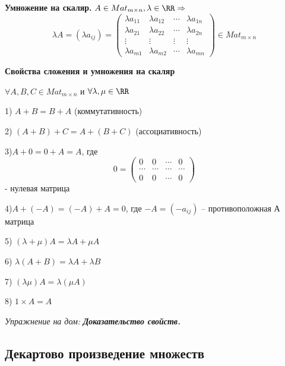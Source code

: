 \textbf{Умножение на скаляр.} $A \in Mat_{m\times n}, \lambda \in \RR \Rightarrow$
\begin{equation*} \lambda A = (\lambda a_{ij}) = 
\begin{pmatrix}
		\lambda a_{11} & \lambda a_{12} & \cdots & \lambda a_{1n} \\
		\lambda a_{21} & \lambda a_{22} & \cdots & \lambda a_{2n} \\
       \vdots & \vdots & \vdots& \vdots \\ 
       \lambda a_{m1} & \lambda a_{m2} & \cdots & \lambda a_{mn}
\end{pmatrix} \in Mat_{m\times n}
\end{equation*}

\bigskip
\textbf{Свойства сложения и умножения на скаляр}

$\forall A, B, C \in Mat_{m\times n}$ и $\forall \lambda, \mu \in \RR$

1) $A + B = B + A$ (коммутативность)

2) $(A + B) + C = A + (B + C)$ (ассоциативность)

3)$A + 0 = 0 + A = A$, где \begin{equation*}0 = \begin{pmatrix}
0 & 0 & \cdots & 0 \\
\cdots & \cdots & \cdots & \cdots \\
0 & 0 & \cdots & 0
\end{pmatrix} \end{equation*} - нулевая матрица

4)$A + (-A) = (-A) + A = 0$, где $-A = (-a_{ij})$ -- противоположная А матрица 

5) $(\lambda + \mu)A = \lambda A + \mu A$

6) $\lambda (A + B) = \lambda A + \lambda B$

7) $(\lambda \mu) A = \lambda (\mu A)$

8) $1 \times A = A$

\bigskip
\textit{Упражнение на дом:} \textbf{\textit{Доказательство свойств.}}

\bigskip
\begin{comment}
	Свойства (1)-(8) означают, что $Mat_{m\times n}$ является             векторным пространством.
\end{comment}

\bigskip
\subsection{Декартово произведение множеств}

